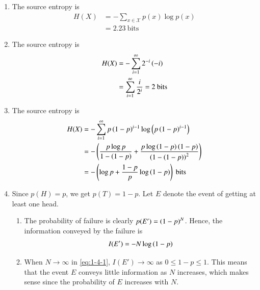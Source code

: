\documentclass[journal,12pt,twocolumn]{IEEEtran}
\renewcommand\thesection{\arabic{section}}
\begin{document}
\begin{enumerate}[label=\thesection.\arabic*, ref=\thesection.\theenumi]
    \item The source entropy is
    \begin{align}
        H(X) &= -\sum_{x\in\mathcal{X}}p(x)\log p(x) \\
        &= 2.23\ \textrm{bits}
        \label{eq:1-1-1}
    \end{align}

    \item The source entropy is
    \begin{align}
        H(X) &= -\sum_{i=1}^{\infty}2^{-i}\left(-i\right) \\
        &= \sum_{i=1}^{\infty}\frac{i}{2^i} = 2\ \textrm{bits}
        \label{eq:1-2-1}
    \end{align}

    \item The source entropy is
    \begin{align}
        H(X) &= -\sum_{i=1}^{\infty}p\brak{1-p}^{i-1}\log\brak{p\brak{1-p}^{i-1}} \\
        &= -\brak{\frac{p\log{p}}{1-\brak{1-p}}+\frac{p\log\brak{1-p}\brak{1-p}}{\brak{1-\brak{1-p}}^2}} \\
        &= -\brak{\log{p} + \frac{1-p}{p}\log\brak{1-p}}\ \textrm{bits}
        \label{eq:1-3-1}
    \end{align}

    \item Since $p(H) = p$, we get $p(T) = 1 - p$. Let $E$ denote the event of
    getting at least one head.
    \begin{enumerate}[label=\theenumi.\arabic*, ref=\theenumi.\arabic*]
        \item The probability of failure is clearly $p(E') = \left(1-p\right)^N$.
        Hence, the information conveyed by the failure is
        \begin{align}
            I(E') = -N\log\left(1-p\right)
            \label{eq:1-4-1}
        \end{align}
        \item When $N \to \infty$ in \eqref{eq:1-4-1}, $I(E') \to \infty$ as
        $0 \le 1 - p \le 1$. This means that the event $E$ conveys little 
        information as $N$ increases, which makes sense since the probability of
        $E$ increases with $N$.
    \end{enumerate}


\end{enumerate}
\end{document}
